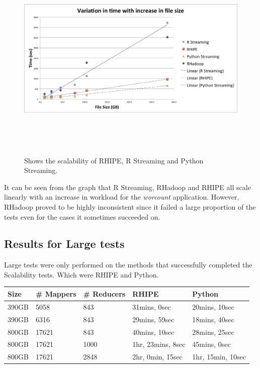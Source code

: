 \documentclass[
journal=jacsat, %
manuscript=article]{achemso}
\begin{document}
\begin{figure}

\includegraphics[width=16cm,height=10cm,keepaspectratio]{scaling.png}

  \caption{Shows the scalability of RHIPE, R Streaming and Python Streaming.}

  \label{scaling}

\end{figure}
It can be seen from the graph that R Streaming, RHadoop and RHIPE all scale linearly with an increase in workload for the \textit{worcount} application. However, RHadoop proved to be highly inconsistent since it failed a large proportion of the tests even for the cases it sometimes succeeded on. 

\subsection{Results for Large tests}
Large tests were only performed on the methods that successfully completed the Scalability tests. Which were RHIPE and Python. 

\begin{table}[H]
\begin{tabular}{ l|  l | l | l | l }
Size &\# Mappers & \# Reducers & RHIPE & Python \\ \hline
390GB & 5058 & 843 & 31mins, 0sec & 20mins, 10sec \\\hline
390GB & 6316 & 843 & 29mins, 59sec & 18mins, 40sec\\\hline
800GB & 17621 & 843 & 40mins, 10sec & 28mins, 25sec \\\hline
800GB & 17621 & 1000 & 1hr, 23mins, 8sec & 45mins, 0sec \\\hline
800GB & 17621 & 2848 & 2hr, 0min, 15sec & 1hr, 15min, 10sec \\\hline
\end{tabular}
\end{table}
\end{document}
